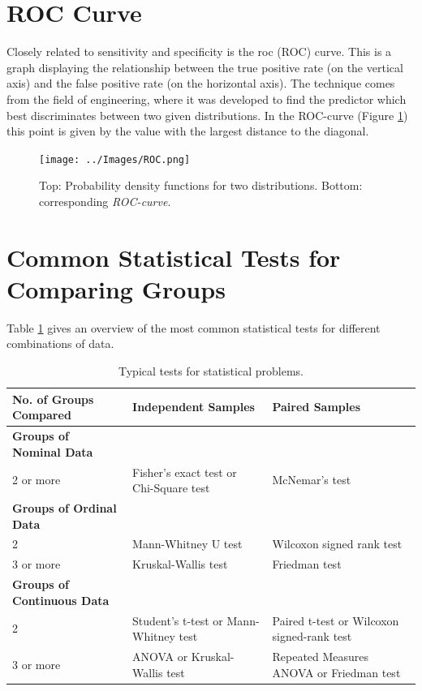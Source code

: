 \section{ROC Curve}

Closely related to sensitivity and specificity is the \acrfull{roc} (ROC) curve. This is a graph displaying the relationship between the true positive rate (on the vertical axis) and the false positive rate (on the horizontal axis). The technique comes from the field of engineering, where it was developed to find the predictor which best discriminates between two given distributions. In the ROC-curve (Figure \ref{fig:ROC}) this point is given by the value with the largest distance to the diagonal.

\begin{figure}[ht]
  \centering
  \texttt{[image: ../Images/ROC.png]}\\
  \caption{Top: Probability density functions for two distributions. Bottom: corresponding \emph{ROC-curve}.}\label{fig:ROC}
\end{figure}

\section{Common Statistical Tests for Comparing Groups}

Table \ref{table:tests} gives an overview of the most common statistical tests for different combinations of data.
\begin{table}
  \centering
  \footnotesize{
  \begin{tabular}{ | p{5cm} || p{5cm} | p{5cm} | }
     \hline
     No. of Groups Compared  & \textbf{Independent Samples} & \textbf{Paired Samples} \\ \hline
     \textbf{Groups of Nominal Data} & & \\ \hline
     2 or more & Fisher's exact test or Chi-Square test & McNemar's test \\ \hline
     \textbf{Groups of Ordinal Data} & & \\ \hline
     2 & Mann-Whitney U test & Wilcoxon signed rank test \\ \hline
     3 or more & Kruskal-Wallis test & Friedman test \\ \hline
     \textbf{Groups of Continuous Data} & & \\ \hline
     2 & Student's t-test or Mann-Whitney test & Paired t-test or Wilcoxon signed-rank test \\ \hline
     3 or more & ANOVA or Kruskal-Wallis test & Repeated Measures ANOVA or Friedman test \\ \hline

  \end{tabular}
  }

  \caption{Typical tests for statistical problems.}\label{table:tests}
\end{table}

